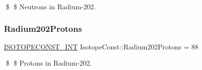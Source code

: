 \$ \$ Neutrons in Radium-\/202. \mbox{\label{group___isotope_const-_radium-_ra202_ga9f5362a70878cc0925d09ef0d7ac607b}} 
\subsubsection{\texorpdfstring{Radium202\+Protons}{Radium202Protons}}
{\footnotesize\ttfamily \mbox{\hyperlink{group___isotope_const-_macros_ga5f18360b3e99483a35c32d789e62621c}{I\+S\+O\+T\+O\+P\+E\+C\+O\+N\+S\+T\+\_\+\+I\+NT}} Isotope\+Const\+::\+Radium202\+Protons = 88}

\$ \$ Protons in Radium-\/202. 